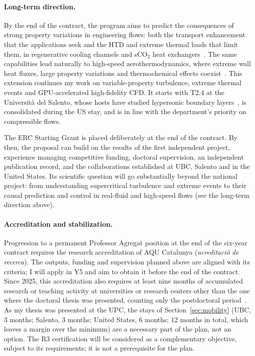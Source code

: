 \documentclass[11pt]{article}
\begin{document}
\paragraph{Long-term direction.} By the end of the contract, the program aims to predict the
consequences of strong property variations in engineering flows: both the transport
enhancement that the applications seek and the HTD and extreme thermal loads that limit them, in
regenerative cooling channels and sCO$_2$ heat exchangers~\cite{Pizzarelli2018,Ahn2015}. The
same capabilities lead naturally to high-speed aerothermodynamics, where extreme wall heat
fluxes, large property variations and thermochemical effects
coexist~\cite{Urzay2018,DiRenzoUrzay2021,Passiatore2022}. This extension continues my work on
variable-property turbulence, extreme thermal events and GPU-accelerated high-fidelity CFD. It
starts with T2.4 at the Universit\`a del Salento, whose hosts have studied hypersonic
boundary layers~\cite{DiRenzoUrzay2021,Passiatore2022}, is consolidated during the US stay, and
is in line with the department's priority on compressible flows.

The ERC Starting Grant is placed deliberately at the end of the contract. By then, the
proposal can build on the results of the first independent project, experience managing
competitive funding, doctoral supervision, an independent publication record, and the
collaborations established at UBC, Salento and in the United States. Its scientific question
will go substantially beyond the national project: from understanding supercritical turbulence
and extreme events to their causal prediction and control in real-fluid and high-speed flows
(see the long-term direction above).

\paragraph{Accreditation and stabilization.} Progression to a permanent Professor Agregat
position at the end of the six-year contract requires the research accreditation of AQU
Catalunya (\emph{acreditaci\'o de recerca}). The outputs, funding and supervision planned
above are aligned with its criteria; I will apply in Y5 and aim to obtain it before the end
of the contract. Since 2025, this accreditation also requires at least nine months of
accumulated research or teaching activity at universities or research centers other than the
one where the doctoral thesis was presented, counting only the postdoctoral
period~\cite{AQU2025}. As my thesis was presented at the UPC, the stays of
Section~\ref{sec:mobility} (UBC, 3 months; Salento, 3 months; United States, 6 months;
12 months in total, which leaves a margin over the minimum) are a necessary part of the plan, not an option. The R3 certification will be considered as a complementary objective, subject
to its requirements; it is not a prerequisite for the plan.
\end{document}
